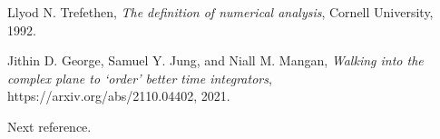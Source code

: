 \providecommand{\bysame}{\leavevmode\hbox to3em{\hrulefill}\thinspace}
\providecommand{\href}[2]{#2}
\begin{thebibliography}{1}

Llyod N. Trefethen, \emph{{T}he definition of numerical analysis}, Cornell University, 1992.

Jithin D. George, Samuel Y. Jung, and Niall M. Mangan, \emph{{W}alking into the complex plane to `order' better time integrators}, https://arxiv.org/abs/2110.04402, 2021.

Next reference.

\end{thebibliography}
